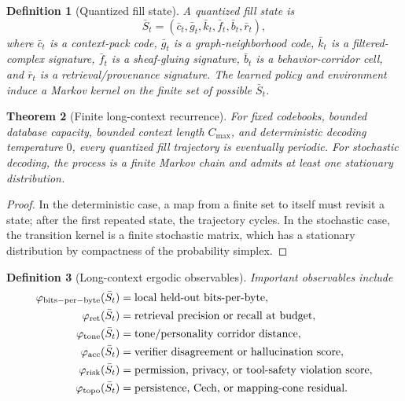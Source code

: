 \documentclass[11pt]{article}
\newtheorem{theorem}{Theorem}[section]
\newtheorem{definition}[theorem]{Definition}
\numberwithin{equation}{section}
\begin{document}
\begin{definition}[Quantized fill state]
A quantized fill state is
\begin{equation}
\bar S_t=(\bar c_t,\bar g_t,\bar k_t,\bar f_t,\bar b_t,\bar r_t),
\end{equation}
where $\bar c_t$ is a context-pack code, $\bar g_t$ is a graph-neighborhood code, $\bar k_t$ is a filtered-complex signature, $\bar f_t$ is a sheaf-gluing signature, $\bar b_t$ is a behavior-corridor cell, and $\bar r_t$ is a retrieval/provenance signature. The learned policy and environment induce a Markov kernel on the finite set of possible $\bar S_t$.
\end{definition}

\begin{theorem}[Finite long-context recurrence]
For fixed codebooks, bounded database capacity, bounded context length $C_{\max}$, and deterministic decoding temperature $0$, every quantized fill trajectory is eventually periodic. For stochastic decoding, the process is a finite Markov chain and admits at least one stationary distribution.
\end{theorem}
\begin{proof}
In the deterministic case, a map from a finite set to itself must revisit a state; after the first repeated state, the trajectory cycles. In the stochastic case, the transition kernel is a finite stochastic matrix, which has a stationary distribution by compactness of the probability simplex.
\end{proof}

\begin{definition}[Long-context ergodic observables]
Important observables include
\begin{align}
\varphi_{\rm bits-per-byte}(\bar S_t)&=\text{local held-out bits-per-byte},\\
\varphi_{\rm ret}(\bar S_t)&=\text{retrieval precision or recall at budget},\\
\varphi_{\rm tone}(\bar S_t)&=\text{tone/personality corridor distance},\\
\varphi_{\rm acc}(\bar S_t)&=\text{verifier disagreement or hallucination score},\\
\varphi_{\rm risk}(\bar S_t)&=\text{permission, privacy, or tool-safety violation score},\\
\varphi_{\rm topo}(\bar S_t)&=\text{persistence, Cech, or mapping-cone residual}.
\end{align}
\end{definition}
\end{document}
